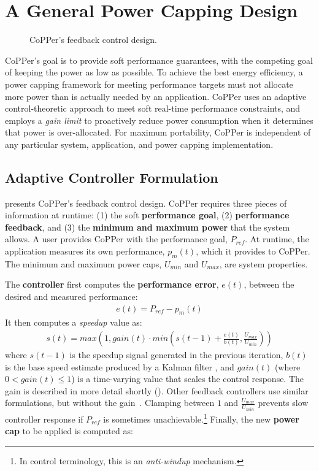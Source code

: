 \section{A General Power Capping Design}
\label{sec:copper-framework}

\begin{figure}[t]
  \centering
  
  \caption{CoPPer's feedback control design.}
  \label{fig:copper-runtime}
\end{figure}

CoPPer's goal is to provide soft performance guarantees, with the competing goal of keeping the power as low as possible.
To achieve the best energy efficiency, a power capping framework for meeting performance targets must not allocate more power than is actually needed by an application.
CoPPer uses an adaptive control-theoretic approach to meet soft real-time performance constraints, and employs a \emph{gain limit} to proactively reduce power consumption when it determines that power is over-allocated.
For maximum portability, CoPPer is independent of any particular system, application, and power capping implementation.


\subsection{Adaptive Controller Formulation}

 presents CoPPer's feedback control design.
CoPPer requires three pieces of information at runtime: (1) the soft \textbf{performance goal}, (2) \textbf{performance feedback}, and (3) the \textbf{minimum and maximum power} that the system allows.
A user provides CoPPer with the performance goal, $P_{ref}$.
At runtime, the application measures its own performance, $p_m(t)$, which it provides to CoPPer.
The minimum and maximum power caps, $U_{min}$ and $U_{max}$, are system properties.

The \textbf{controller} first computes the \textbf{performance error}, $e(t)$, between the desired and measured performance:
\begin{eqnarray}
  e(t) = P_{ref} - p_m(t)
  \label{eqn:copper-error}
\end{eqnarray}
It then computes a \emph{speedup} value as:
\begin{eqnarray}
  s(t) = max\left(1, gain(t) \cdot min\left(s(t-1) + \frac{e(t)}{b(t)}, \frac{U_{max}}{U_{min}}\right)\right)
  \label{eqn:copper-speedup-control}
\end{eqnarray}
where $s(t-1)$ is the speedup signal generated in the previous iteration, $b(t)$ is the base speed estimate produced by a Kalman filter \cite{welch2006kalman}, and $gain(t)$ (where $0 < gain(t) \le 1$) is a time-varying value that scales the control response.
The gain is described in more detail shortly ().
Other feedback controllers use similar formulations, but without the gain~\cite{POET,Bard}.
Clamping between $1$ and $\frac{U_{max}}{U_{min}}$ prevents slow controller response if $P_{ref}$ is sometimes unachievable.\footnote{In control terminology, this is an \emph{anti-windup} mechanism.}
Finally, the new \textbf{power cap} to be applied is computed as:


